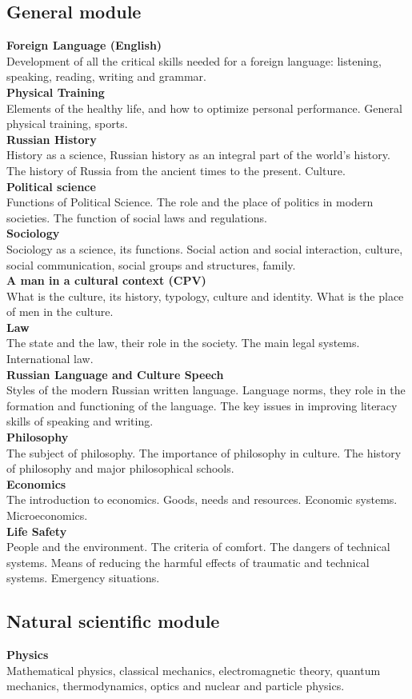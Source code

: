 \documentclass[a4paper, 12pt]{article}
\newcommand{\group}[1] {\subsection{#1}}
\newcommand{\discipline}[1] {\textbf{#1} \\ }
\newcommand{\desc}[1] { #1 \\ }
\begin{document}
\group{General module}

\discipline{Foreign Language (English)}
\desc{Development of all the critical skills needed for a foreign language: listening, speaking, reading, writing and grammar.}

\discipline{Physical Training}
\desc{Elements of the healthy life, and how to optimize personal performance. General physical training, sports.}

\discipline{Russian History}
\desc{History as a science, Russian history as an integral part of the world's history. The history of Russia from the ancient times to the present. Culture.}

\discipline{Political science}
\desc{Functions of Political Science. The role and the place of politics in modern societies. The function of social laws and regulations.}

\discipline{Sociology}
\desc{Sociology as a science, its functions. Social action and social interaction, culture, social communication, social groups and structures, family.}

\discipline{A man in a cultural context (CPV)}
\desc{What is the culture, its history, typology, culture and identity. What is the place of men in the culture.}

\discipline{Law}
\desc{The state and the law, their role in the society. The main legal systems. International law.}

\discipline{Russian Language and Culture Speech}
\desc{Styles of the modern Russian written language. Language norms, they role in the formation and functioning of the language. The key issues in improving literacy skills of speaking and writing.}

\discipline{Philosophy}
\desc{The subject of philosophy. The importance of philosophy in culture. The history of philosophy and major philosophical schools.}

\discipline{Economics}
\desc{The introduction to economics. Goods, needs and resources. Economic systems. Microeconomics.}

\discipline{Life Safety}
\desc{People and the environment. The criteria of comfort. The dangers of technical systems. Means of reducing the harmful effects of traumatic and technical systems. Emergency situations.}


\group{Natural scientific module}

\discipline{Physics}
\desc{Mathematical physics, classical mechanics, electromagnetic theory, quantum mechanics, thermodynamics, optics and nuclear and particle physics.}
\end{document}
